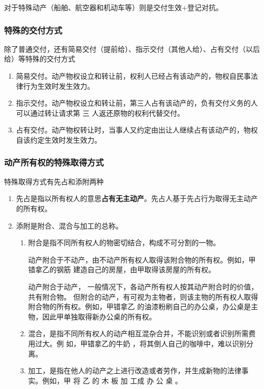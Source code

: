 \documentclass[UTF8,12pt]{ctexart}
\numberwithin{equation}{section} %
\numberwithin{figure}{section}
\numberwithin{table}{section}
\begin{document}
	对于特殊动产（船舶、航空器和机动车等）则是交付生效+登记对抗。
	
	\subsubsection{特殊的交付方式}
	除了普通交付，还有简易交付（提前给）、指示交付（其他人给）、占有交付（以后给）等特殊的交付方式
	\begin{enumerate}
		\item 简易交付。动产物权设立和转让前，权利人已经占有该动产的，物权自民事法律行为生效时发生效力。
		
		\item 指示交付。动产物权设立和转让前，第三人占有该动产的，负有交付义务的人可以通过转让请求第 三 人返还原物的权利代替交付。
		
		\item 占有交付。动产物权转让时，当事人又约定由出让人继续占有该动产的，物权自该约定生效时发生效力。
	\end{enumerate}

	\subsubsection{动产所有权的特殊取得方式}
	特殊取得方式有先占和添附两种
	\begin{enumerate}
		\item 先占是指以所有权人的意思\textbf{占有无主动产}。先占人基于先占行为取得无主动产的所有权。
		
		\item 添附是附合、混合与加工的总称。
		\begin{enumerate}
			\item 附合是指不同所有权人的物密切结合，构成不可分割的一物。 
			
			动产附合于不动产，由不动产所有权人取得该附合物的所有权。例如，甲错拿乙的钢筋 建造自己的房屋，由甲取得该房屋的所有权。
			
			动产附合于动产， 一般情况下，各动产所有权人按其动产附合时的价值，共有附合物。 但附合的动产，有可视为主物者，则该主物的所有权人取得附合物的所有权。例如，甲错拿乙 的油漆粉刷自己的办公桌，办公桌是主物，因此甲单独取得新办公桌的所有权。 
			
			\item 混合，是指不同所有权人的动产相互混杂合并，不能识别或者识别所需费用过大。例 如，甲错拿乙的牛奶 ，将其倒人自己的咖啡中，难以识别分离。
			
			\item 加工，是指在他人的动产之上进行改造或者劳作，并生成新物的法律事实。例如，甲 将 乙 的 木 板 加 工成 办 公 桌 。
		\end{enumerate}
	\end{enumerate}
	
\end{document}
